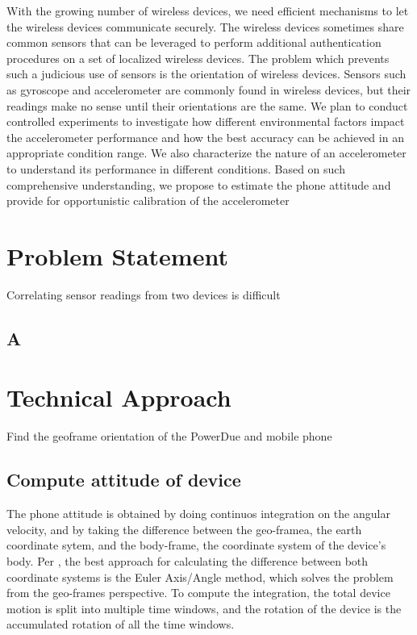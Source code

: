 \documentclass[journal]{IEEEtranTIE}
\begin{document}
With the growing number of wireless devices, we need efficient mechanisms to let the wireless devices communicate securely. The wireless devices sometimes share common sensors that can be leveraged to perform additional authentication procedures on a set of localized wireless devices. The problem which prevents such a judicious use of sensors is the orientation of wireless devices. Sensors such as gyroscope and accelerometer are commonly found in wireless devices, but their readings make no sense until their orientations are the same. We plan to conduct controlled experiments to investigate how different environmental factors impact the accelerometer performance and how the best accuracy can be achieved in an appropriate condition range. We also characterize the nature of an accelerometer to understand its performance in different conditions. Based on such comprehensive understanding, we propose to estimate the phone attitude and provide for opportunistic calibration of the accelerometer

\section{Problem Statement}

Correlating sensor readings from two devices is difficult

\subsection{A}

\section{Technical Approach}

Find the geoframe orientation of the PowerDue and mobile phone

\subsection{Compute attitude of device}

The phone attitude is obtained by doing continuos integration on the angular
velocity, and by taking the difference between the geo-framea, the earth
coordinate sytem, and the body-frame, the coordinate system of the device's
body. Per \cite{PhoneAttitude}, the best approach for calculating the difference
between both coordinate systems is the Euler Axis/Angle method, which solves the
problem from the geo-frames perspective. To compute the integration, the total
device motion is split into multiple time windows, and the rotation of the
device is the accumulated rotation of all the time windows.
\end{document}
